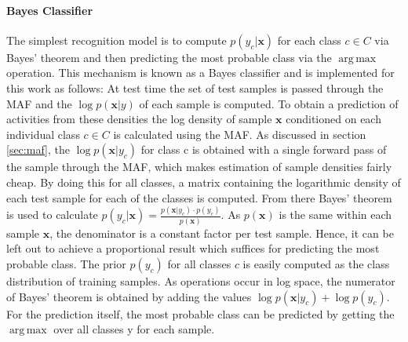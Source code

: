 \documentclass[11pt,titlepage,oneside,openany]{book}
\DeclareMathOperator*{\argmax}{arg\,max}
\begin{document}
\paragraph{Bayes Classifier}
The simplest recognition model is to compute $p(y_c|\pmb{x})$ for each class $c \in C$ via Bayes' theorem and then predicting the most probable class via the $\argmax$ operation. This mechanism is known as a Bayes classifier and is implemented for this work as follows: At test time the set of test samples is passed through the MAF and the $\log p(\pmb{x}|y)$ of each sample is computed. To obtain a prediction of activities from these densities the log density of sample $\pmb{x}$ conditioned on each individual class $c \in C$ is calculated using the MAF. As discussed in section \ref{sec:maf}, the $\log p(\pmb{x}|y_c)$ for class c is obtained with a single forward pass of the sample through the MAF, which makes estimation of sample densities fairly cheap. By doing this for all classes, a matrix containing the logarithmic density of each test sample for each of the classes is computed. From there Bayes' theorem is used to calculate $p(y_c|\pmb{x}) = \frac{p(\pmb{x}|y_c) \cdot p(y_c)}{p(\pmb{x})}$. As $p(\pmb{x})$ is the same within each sample $\pmb{x}$, the denominator is a constant factor per test sample. Hence, it can be left out to achieve a proportional result which suffices for predicting the most probable class. The prior $p(y_c)$ for all classes $c$ is easily computed as the class distribution of training samples. As operations occur in log space, the numerator of Bayes' theorem is obtained by adding the values $\log p(\pmb{x}|y_c) + \log p(y_c)$. For the prediction itself, the most probable class can be predicted by getting the $\argmax$ over all classes y for each sample.
\end{document}
